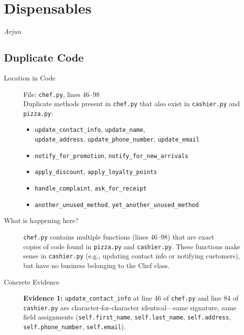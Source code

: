 \documentclass[12pt]{article}
\begin{document}
\section{Dispensables}

\textit{Arjun}

\subsection{Duplicate Code}

\begin{description}
    \item[Location in Code]
        File: \texttt{chef.py}, lines 46--98 \\
        Duplicate methods present in \texttt{chef.py} that also exist in \texttt{cashier.py} and \texttt{pizza.py}:
        \begin{itemize}
            \item \texttt{update\_contact\_info}, \texttt{update\_name}, \\ 
            \texttt{update\_address}, \texttt{update\_phone\_number}, \texttt{update\_email}
            \item \texttt{notify\_for\_promotion}, \texttt{notify\_for\_new\_arrivals}
            \item \texttt{apply\_discount}, \texttt{apply\_loyalty\_points}
            \item \texttt{handle\_complaint}, \texttt{ask\_for\_receipt}
            \item \texttt{another\_unused\_method}, \texttt{yet\_another\_unused\_method}
        \end{itemize}

    \item[What is happening here?]
        \texttt{chef.py} contains multiple functions (lines 46--98) that are exact \\
        copies of code found in \texttt{pizza.py} and \texttt{cashier.py}. These functions make sense in
        \texttt{cashier.py} (e.g., updating contact info or notifying customers), but have no
        business belonging to the Chef class.

    \item[Concrete Evidence]
        \textbf{Evidence 1:} \texttt{update\_contact\_info} at line 46 of \texttt{chef.py} and
        line 84 of \texttt{cashier.py} are character-for-character identical---same signature,
        same field assignments (\texttt{self.first\_name}, \texttt{self.last\_name},
        \texttt{self.address}, \texttt{self.phone\_number}, \texttt{self.email}).


\end{description}
\end{document}
